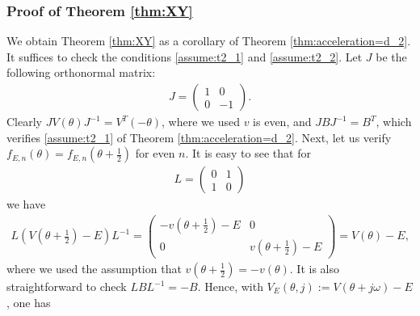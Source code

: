 \documentclass[11pt]{amsart}
\begin{document}
\subsubsection*{Proof of Theorem \ref{thm:XY}}
We obtain Theorem \ref{thm:XY} as a corollary of Theorem \ref{thm:acceleration=d_2}.
It suffices to check the conditions \eqref{assume:t2_1} and \eqref{assume:t2_2}.
Let $J$ be the following orthonormal matrix:
\begin{align}
J=\left(\begin{matrix} 1 & 0\\ 0 &-1\end{matrix}\right). 
\end{align}
Clearly $JV(\theta)J^{-1}=V^T(-\theta)$, where we used $v$ is even, and $JBJ^{-1}=B^T$, which verifies \eqref{assume:t2_1} of Theorem \ref{thm:acceleration=d_2}.
Next, let us verify $f_{E,n}(\theta)=f_{E,n}(\theta+\frac{1}{2})$ for even $n$.
It is easy to see that for 
\begin{align}
    L=\left(\begin{matrix}0 & 1\\ 1 & 0\end{matrix}\right)
\end{align}
we have
\begin{align}
    L(V(\theta+\frac{1}{2})-E)L^{-1}=\left(\begin{matrix} -v(\theta+\frac{1}{2})-E &0\\ 0&v(\theta+\frac{1}{2})-E\end{matrix}\right)=V(\theta)-E,
\end{align}
where we used the assumption that $v(\theta+\frac{1}{2})=-v(\theta)$. It is also straightforward to check $LBL^{-1}=-B$.
Hence, with $V_E(\theta,j):=V(\theta+j\omega)-E$, one has 
\end{document}
